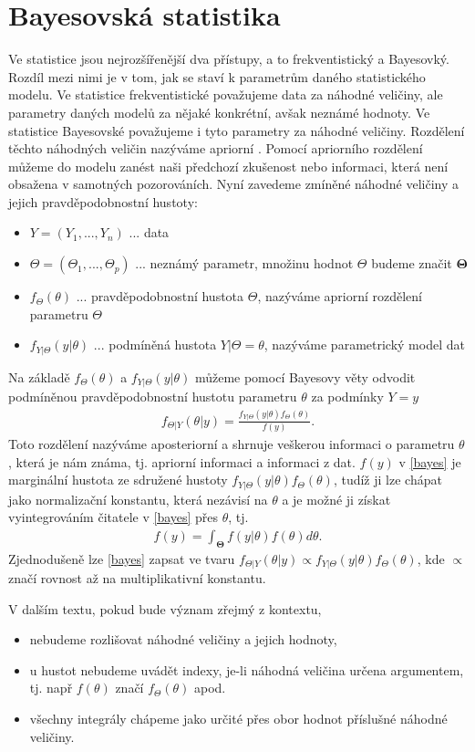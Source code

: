 \documentclass[czech,master,public,dept470,male,cpdeclaration,oneside, python]{diploma}
\begin{document}
\section{Bayesovská statistika}
Ve statistice jsou nejrozšířenější dva přístupy, a to frekventistický a Bayesovký. Rozdíl mezi nimi je v tom, jak se staví k parametrům daného statistického modelu. Ve statistice frekventistické považujeme data za náhodné veličiny, ale parametry daných modelů za nějaké konkrétní, avšak neznámé hodnoty. Ve statistice Bayesovské považujeme i tyto parametry za náhodné veličiny. Rozdělení těchto náhodných veličin nazýváme apriorní \cite{robert2007bayesian}. Pomocí apriorního rozdělení můžeme do modelu zanést naši předchozí zkušenost nebo informaci, která není obsažena v samotných pozorováních. Nyní zavedeme zmíněné náhodné veličiny a jejich pravděpodobnostní hustoty:
\begin{itemize}
	\item $Y = ( Y_1, ..., Y_n)$ ... data
	\item $\Theta = (\Theta_1, ... ,\Theta_p)$ ... neznámý parametr, množinu hodnot $\Theta$ budeme značit $\boldsymbol{\Theta}$
	\item $f_{\Theta}(\theta)$ ... pravděpodobnostní hustota $\Theta$, nazýváme apriorní rozdělení parametru $\Theta$ 
	\item $f_{Y|\Theta}(y|\theta)$ ... podmíněná hustota $Y | \Theta = \theta$, nazýváme parametrický model dat
\end{itemize}\par
Na základě $f_{\Theta}(\theta)$ a $f_{Y|\Theta}(y|\theta)$ můžeme pomocí Bayesovy věty odvodit podmíněnou pravděpodobnostní hustotu parametru $\theta$ za podmínky $Y=y$
\begin{align} \label{bayes}
f_{\Theta|Y}(\theta | y) = \frac{f_{Y|\Theta}(y|\theta)f_{\Theta}(\theta)}{f(y)}.
\end{align}
Toto rozdělení nazýváme aposteriorní a shrnuje veškerou informaci o parametru $\theta$, která je nám známa, tj. apriorní informaci a informaci z dat. $f(y)$ v \eqref{bayes} je marginální hustota ze sdružené hustoty $f_{Y|\Theta}(y|\theta)f_{\Theta}(\theta)$, tudíž ji lze chápat jako normalizační konstantu, která nezávisí na $\theta$ a je možné ji získat vyintegrováním čitatele v \eqref{bayes}  přes $\theta$, tj.
\begin{align*}
f(y) = \int_{\boldsymbol{\Theta}} f(y|\theta)f(\theta) d\theta.
\end{align*}
Zjednodušeně lze \eqref{bayes} zapsat ve tvaru $f_{\Theta|Y}(\theta | y) \propto f_{Y|\Theta}(y|\theta)f_{\Theta}(\theta)$, kde $\propto$ značí rovnost až na multiplikativní konstantu. \par
V dalším textu, pokud bude význam zřejmý z kontextu,
\begin{itemize}
	\item nebudeme rozlišovat náhodné veličiny a jejich hodnoty,
	\item u hustot nebudeme uvádět indexy, je-li náhodná veličina určena argumentem, tj. např $f(\theta)$ značí $f_{\Theta}(\theta)$ apod.
	\item všechny integrály chápeme jako určité přes obor hodnot příslušné náhodné veličiny.
\end{itemize}
\end{document}

